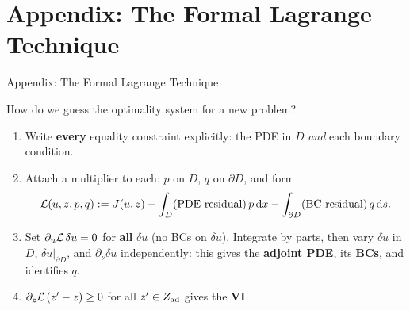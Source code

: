 \documentclass[main.tex]{subfiles}
\begin{document}
\section{Appendix: The Formal Lagrange Technique}

\begin{frame}[label=lagrange]{Appendix: The Formal Lagrange Technique}
  \begin{qbox}
    How do we guess the optimality system for a new problem?
  \end{qbox}

  \begin{hlbox}
    \begin{enumerate}
      \item<2-> Write \textbf{every} equality constraint explicitly: the PDE in $D$ \emph{and} each boundary condition.
      \item<3-> Attach a multiplier to each: $p$ on $D$, $q$ on $\partial D$, and form
        \[
          \mathcal{L}(u,z,p,q) := J(u,z) - \int_D (\text{PDE residual})\, p \,\mathrm{d} x - \int_{\partial D} (\text{BC residual})\, q \,\mathrm{d} s .
        \]
      \item<4-> Set $\partial_u \mathcal{L}\,\delta u = 0$ for \textbf{all} $\delta u$ (no BCs on $\delta u$). Integrate by parts, then vary $\delta u$ in $D$, $\delta u|_{\partial D}$, and $\partial_\nu \delta u$ independently: this gives the \textbf{adjoint PDE}, its \textbf{BCs}, and identifies $q$.
      \item<5-> $\partial_z \mathcal{L}\,(z' - z) \ge 0$ for all $z' \in Z_{\rm ad}$ gives the \textbf{VI}.
    \end{enumerate}
  \end{hlbox}
  \vfill\hfill\hyperlink{kkt<3>}{}
\end{frame}
\end{document}
